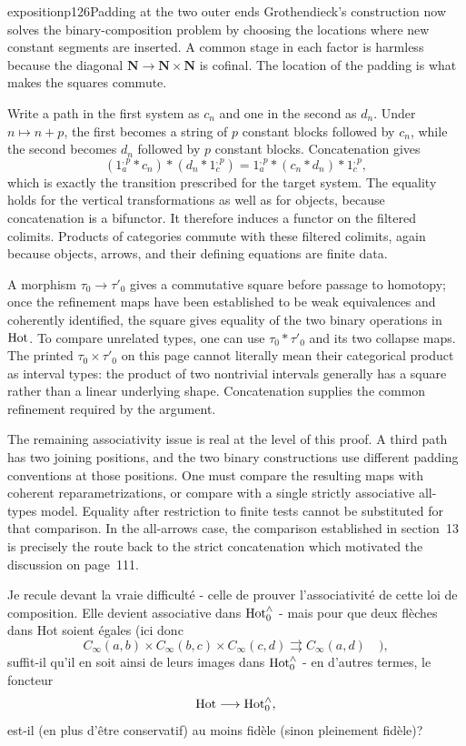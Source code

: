 \begin{dcomment}{exposition}{p126}{Padding at the two outer ends}
Grothendieck's construction now solves the binary-composition problem by choosing the locations where new constant segments are inserted. A common stage in each factor is harmless because the diagonal $\mathbf N\to\mathbf N\times\mathbf N$ is cofinal. The location of the padding is what makes the squares commute.

Write a path in the first system as $c_n$ and one in the second as $d_n$. Under $n\mapsto n+p$, the first becomes a string of $p$ constant blocks followed by $c_n$, while the second becomes $d_n$ followed by $p$ constant blocks. Concatenation gives
\[
 (1_a^{,p}*c_n)*(d_n*1_c^{,p})
       =1_a^{,p}*(c_n*d_n)*1_c^{,p},
\]
which is exactly the transition prescribed for the target system. The equality holds for the vertical transformations as well as for objects, because concatenation is a bifunctor. It therefore induces a functor on the filtered colimits. Products of categories commute with these filtered colimits, again because objects, arrows, and their defining equations are finite data.

A morphism $\tau_0\to\tau'_0$ gives a commutative square before passage to homotopy; once the refinement maps have been established to be weak equivalences and coherently identified, the square gives equality of the two binary operations in $\mathrm{Hot}$. To compare unrelated types, one can use $\tau_0*\tau'_0$ and its two collapse maps. The printed $\tau_0\times\tau'_0$ on this page cannot literally mean their categorical product as interval types: the product of two nontrivial intervals generally has a square rather than a linear underlying shape. Concatenation supplies the common refinement required by the argument.

The remaining associativity issue is real at the level of this proof. A third path has two joining positions, and the two binary constructions use different padding conventions at those positions. One must compare the resulting maps with coherent reparametrizations, or compare with a single strictly associative all-types model. Equality after restriction to finite tests cannot be substituted for that comparison. In the all-arrows case, the comparison established in section~13 is precisely the route back to the strict concatenation which motivated the discussion on page~111.
\end{dcomment}


Je recule devant la vraie difficulté - celle de prouver l'associativité de cette loi de composition. Elle devient associative dans $\mathrm{Hot}^{\wedge}_{0}$ - mais pour que deux flèches dans Hot soient égales (ici donc
\[ C_\infty(a,b)\times C_\infty(b,c)\times C_\infty(c,d) \rightrightarrows C_\infty(a,d)\quad ), \]
suffit-il qu'il en soit ainsi de leurs images dans $\mathrm{Hot}^{\wedge}_{0}$ - en d'autres termes, le foncteur
\[ \mathrm{Hot}\longrightarrow\mathrm{Hot}^{\wedge}_{0}, \]
est-il (en plus d'être conservatif) au moins fidèle (sinon pleinement fidèle)?

